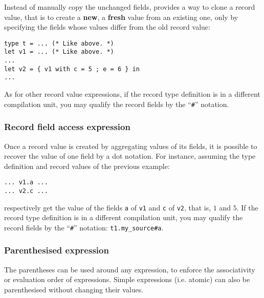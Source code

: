 Instead of manually copy the unchanged fields, {\focal} provides a way
to clone a record value, that is to create a {\bf new}, a {\bf fresh}
value from an existing one,  only by specifying the fields whose values
differ from the old record value:

{\scriptsize
\begin{lstlisting}
type t = ... (* Like above. *)
let v1 = ... (* Like above. *)
...
let v2 = { v1 with c = 5 ; e = 6 } in
...
\end{lstlisting}}

As for other record value expressions, if the record type definition
is in a different compilation unit, you may qualify the record fields
by the ``{\tt\#}'' notation.



\subsubsection{Record field access expression}
\label{record-field-access}
Once a record value is created by aggregating values of its fields, it
is possible to recover the value of one field by a dot notation. For
instance, assuming the type definition and record values of the
previous example:

{\scriptsize
\begin{lstlisting}
... v1.a ...
... v2.c ...
\end{lstlisting}}

respectively get the value of the fields {\tt a} of {\tt v1} and
{\tt c} of {\tt v2}, that is, $1$ and $5$. If the record type
definition is in a different compilation unit, you may qualify the
record fields by the ``{\tt\#}'' notation: {\tt t1.my\_source\#a}.



\subsubsection{Parenthesised expression}
The parentheses can be used around any expression, to enforce the
associativity or evaluation order of expressions. Simple expressions
(i.e. atomic) can also be parenthesised without changing their
values.



